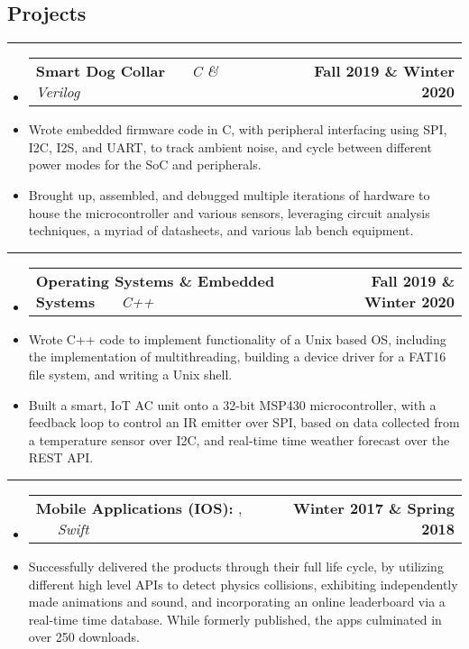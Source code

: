 \documentclass[10pt,letterpaper]{article}
\makeatletter
\newcommand{\header}[2]
{
	\begin{tabular*}{\linewidth}{l @{\extracolsep{\fill}} r}
		\hspace{-27pt} #1 & #2 \\
	\end{tabular*}
}
\newcommand{\sectionbreak}
{
	\vspace{-1.2em}
	\rule{\textwidth}{1.7pt}
	\vspace{-1.7em}
}
\makeatother
\begin{document}
\vspace{-1.5em}

\subsection*{Projects}
\sectionbreak


\begin{itemize}
	\item[]
		\header
		{
			\textbf{Smart Dog Collar}
			\emph{\smash{Senior Design Project}} \ \ \ \footnotesize \emph{C \& Verilog}
		}
		{\textbf{Fall 2019 \& Winter 2020}}
	\item 
		Wrote embedded firmware code in C, with peripheral interfacing using SPI, I2C, I2S, and UART, to track ambient noise,
		and cycle between different power modes for the SoC and peripherals.
	\item 
		Brought up, assembled, and debugged multiple iterations of hardware to house the microcontroller and various sensors, leveraging circuit analysis techniques, a myriad of datasheets, and various lab bench equipment.

\end{itemize}

\hrule

\begin{itemize}
	\item[]
		\header
		{
			\textbf{Operating Systems \& Embedded Systems}
			\emph{\smash{Relevant Course Project}} \ \ \ \footnotesize \emph{C++}
		}
		{\textbf{Fall 2019 \& Winter 2020}}
	\item 
		Wrote C++ code to implement functionality of a Unix based OS, including the implementation of multithreading, building a device driver for a FAT16 file system, and writing a Unix shell.
	\item 
		Built a smart, IoT AC unit onto a 32-bit MSP430 microcontroller, with a feedback loop to control an IR emitter over SPI, based on data collected from a temperature sensor over I2C, and real-time time weather forecast over the REST API. 

\end{itemize}

\hrule

\begin{itemize}
	\item[]
		\header
		{
			\textbf{Mobile Applications (IOS): }
			\href{https://appadvice.com/app/round-bound/1369632746}{\emph{\underline{\smash{Round 'a Bound}}}}, 
			\href{https://appadvice.com/app/tic-tac-emoji/1346934986}{\emph{\underline{\smash{Tic-Tac Emoji}}}} \ \ \ \footnotesize  \emph{Swift}
		}
		{\textbf{Winter 2017 \& Spring 2018}}
	\item 
		Successfully delivered the products through their full life cycle, by utilizing different high level APIs to detect physics collisions, exhibiting independently made animations and sound, and incorporating an online leaderboard via a real-time time database. While formerly published, the apps culminated in over 250 downloads.
\end{itemize}
\end{document}
